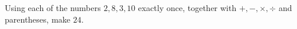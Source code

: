 Using each of the numbers $2,8,3,10$ exactly once, together with $+,-,\times,\div$ and parentheses, make $24$.
